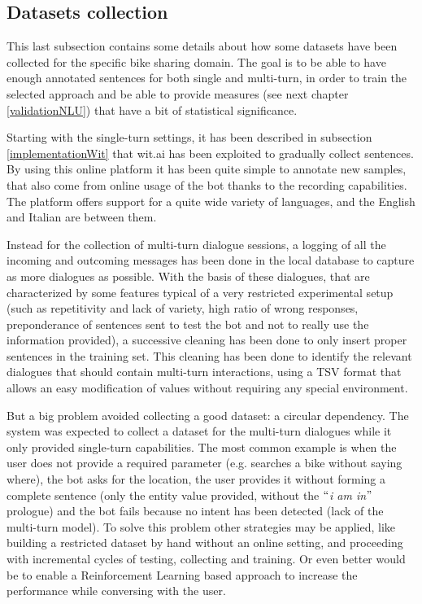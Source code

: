 \subsection{Datasets collection}
\label{implementationDatasets}

This last subsection contains some details about how some datasets have been collected for the specific bike sharing domain. The goal is to be able to have enough annotated sentences for both single and multi-turn, in order to train the selected approach and be able to provide measures (see next chapter \ref{validationNLU}) that have a bit of statistical significance.

Starting with the single-turn settings, it has been described in subsection \ref{implementationWit} that wit.ai has been exploited to gradually collect sentences. By using this online platform it has been quite simple to annotate new samples, that also come from online usage of the bot thanks to the recording capabilities. The platform offers support for a quite wide variety of languages, and the English and Italian are between them.

Instead for the collection of multi-turn dialogue sessions, a logging of all the incoming and outcoming messages has been done in the local database to capture as more dialogues as possible. With the basis of these dialogues, that are characterized by some features typical of a very restricted experimental setup (such as repetitivity and lack of variety, high ratio of wrong responses, preponderance of sentences sent to test the bot and not to really use the information provided), a successive cleaning has been done to only insert proper sentences in the training set. This cleaning has been done to identify the relevant dialogues that should contain multi-turn interactions, using a TSV format that allows an easy modification of values without requiring any special environment.

But a big problem avoided collecting a good dataset: a circular dependency. The system was expected to collect a dataset for the multi-turn dialogues while it only provided single-turn capabilities. The most common example is when the user does not provide a required parameter (e.g. searches a bike without saying where), the bot asks for the location, the user provides it without forming a complete sentence (only the entity value provided, without the $``$\textit{i am in}$"$  prologue) and the bot fails because no intent has been detected (lack of the multi-turn model). To solve this problem other strategies may be applied, like building a restricted dataset by hand without an online setting, and proceeding with incremental cycles of testing, collecting and training. Or even better would be to enable a Reinforcement Learning based approach to increase the performance while conversing with the user.
